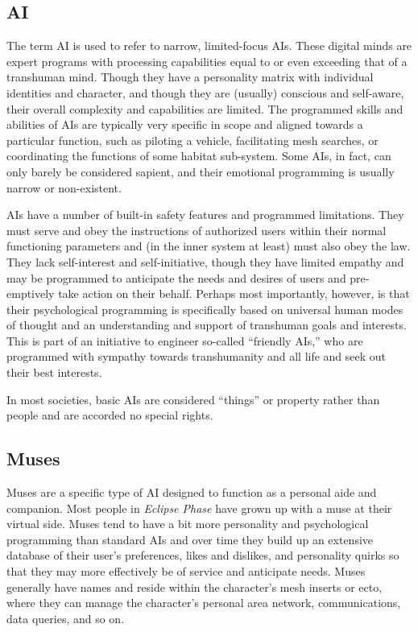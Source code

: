 \subsection{AI} 

The term AI is used to refer to narrow, limited-focus AIs. These digital minds are expert programs with processing capabilities equal to or even exceeding that of a transhuman mind. Though they have a personality matrix with individual identities and character, and though they are (usually) conscious and self-aware, their overall complexity and capabilities are limited. The programmed skills and abilities of AIs are typically very specific in scope and aligned towards a particular function, such as piloting a vehicle, facilitating mesh searches, or coordinating the functions of some habitat sub-system. Some AIs, in fact, can only barely be considered sapient, and their emotional programming is usually narrow or non-existent. 

AIs have a number of built-in safety features and programmed limitations. They must serve and obey the instructions of authorized users within their normal functioning parameters and (in the inner system at least) must also obey the law. They lack self-interest and self-initiative, though they have limited empathy and may be programmed to anticipate the needs and desires of users and pre-emptively take action on their behalf. Perhaps most importantly, however, is that their psychological programming is specifically based on universal human modes of thought and an understanding and support of transhuman goals and interests. This is part of an initiative to engineer so-called ``friendly AIs,'' who are programmed with sympathy towards transhumanity and all life and seek out their best interests. 

In most societies, basic AIs are considered ``things'' or property rather than people and are accorded no special rights. 

\subsection{Muses} 

Muses are a specific type of AI designed to function as a personal aide and companion. Most people in \textit{Eclipse Phase} have grown up with a muse at their virtual side. Muses tend to have a bit more personality and psychological programming than standard AIs and over time they build up an extensive database of their user's preferences, likes and dislikes, and personality quirks so that they may more effectively be of service and anticipate needs. Muses generally have names and reside within the character's mesh inserts or ecto, where they can manage the character's personal area network, communications, data queries, and so on. 

